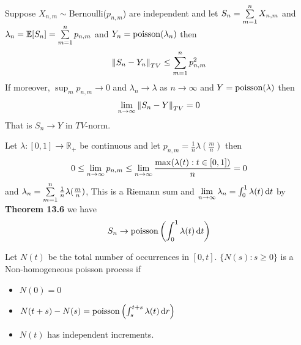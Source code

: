 \documentclass[12pt,a4paper]{article}
\begin{document}
\newpage

\begin{thm}[]
Suppose $X_{n,m}\sim $Bernoulli($p_{n,m}$) are independent and let 
$S_n = \sum\limits_{m=1}^{n}X_{n,m}$ and $\lambda_n = \mathbb{E}[S_n] = \sum\limits_{m=1}^{n}p_{n,m}$ and $Y_n = \mathrm{poisson}(\lambda_n)$ then
\begin{align*}
\norm{S_n - Y_n}_{TV} \leq \sum\limits_{m=1}^{n}p^2_{n,m}
\end{align*}
If moreover, $\sup_{m}p_{n,m} \rightarrow 0$ and $\lambda_n\to \lambda$ as $n\to \infty$ and $Y = \mathrm{poisson}(\lambda)$ then 
\begin{align*}
\lim\limits_{n \rightarrow \infty}\norm{S_n - Y}_{TV} = 0
\end{align*}
That is $S_n \to Y$ in $TV$-norm.
\end{thm}

\begin{example}
Let $\lambda: [0,1] \to \mathbb{R}_{+}$ be continuous and let $p_{n,m} = \frac{1}{n}\lambda(\frac{m}{n})$ then 
\begin{align*}
0\leq \lim\limits_{n \rightarrow \infty}p_{n,m} \leq \lim\limits_{n \rightarrow \infty}\frac{\max(\lambda(t) : t\in [0,1])}{n} = 0
\end{align*}
and $\lambda_n = \sum\limits_{m=1}^{n}\frac{1}{n}\lambda(\frac{m}{n})$, This is a Riemann sum and $\lim\limits_{n \rightarrow \infty}\lambda_n = \int_0^1 \lambda(t)\dd{t}$ by \textbf{Theorem 13.6} we have 
\begin{align*}
S_n \to \mathrm{poisson}\left(\int_0^1\lambda(t)\dd{t}\right)
\end{align*}
\end{example}
\begin{defn}
Let $N(t)$ be the total number of occurrences in $[0,t]$.
$\{N(s) : s\geq 0\}$ is a Non-homogeneous poisson process if
\begin{itemize}[(i)]
\item $N(0) = 0$
\item $N(t+s) - N(s) = \mathrm{poisson}\left(\int_{s}^{t+s}\lambda(t)\dd{r} \right)$
\item $N(t)$ has independent increments. 
\end{itemize}
\end{defn}
\newpage
\end{document}
